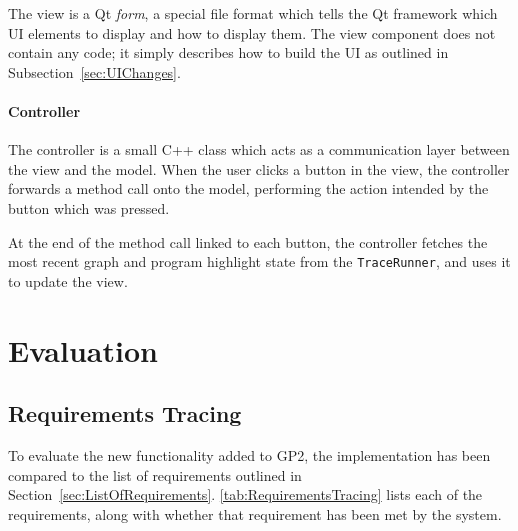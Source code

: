 \documentclass[authoryearcitations]{UoYCSproject}
\begin{document}
The view is a Qt \emph{form}, a special file format which tells the Qt
framework which UI elements to display and how to display them. The view
component does not contain any code; it simply describes how to build the UI as
outlined in Subsection~\ref{sec:UIChanges}.

\subsubsection{Controller}
\label{sec:MVCController}

The controller is a small C++ class which acts as a communication layer between
the view and the model. When the user clicks a button in the view, the controller
forwards a method call onto the model, performing the action intended by the
button which was pressed.

At the end of the method call linked to each button, the controller fetches the
most recent graph and program highlight state from the \texttt{TraceRunner}, and
uses it to update the view.

\clearpage


\chapter{Evaluation}
\label{cha:Evaluation}

\section{Requirements Tracing}
\label{sec:RequirementsTracing}

To evaluate the new functionality added to GP2, the implementation has been
compared to the list of requirements outlined in Section~\ref{sec:ListOfRequirements}.
\autoref{tab:RequirementsTracing} lists each of the requirements, along with whether
that requirement has been met by the system.
\end{document}
